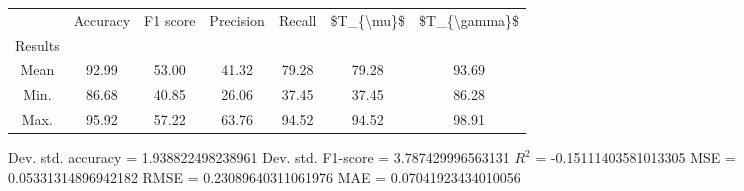\begin{tabular}{|c|c|c|c|c|c|c|}
\toprule
{} &  Accuracy &  F1 score &  Precision &  Recall &  \$T\_\{\textbackslash mu\}\$ &  \$T\_\{\textbackslash gamma\}\$ \\
Results &           &           &            &         &            &               \\
\hline
Mean    &     92.99 &     53.00 &      41.32 &   79.28 &      79.28 &         93.69 \\
Min.    &     86.68 &     40.85 &      26.06 &   37.45 &      37.45 &         86.28 \\
Max.    &     95.92 &     57.22 &      63.76 &   94.52 &      94.52 &         98.91 \\
\bottomrule
\end{tabular}

 Dev. std. accuracy = 1.938822498238961
 Dev. std. F1-score = 3.787429996563131
 $R^2$ = -0.15111403581013305
 MSE = 0.05331314896942182
 RMSE = 0.23089640311061976
 MAE = 0.07041923434010056